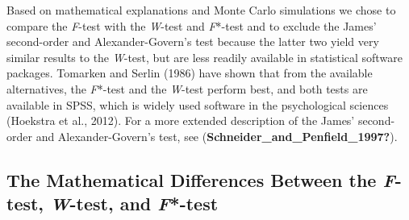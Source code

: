 \documentclass[
  english,
  man]{apa6}
\begin{document}
Based on mathematical explanations and Monte Carlo simulations we chose to compare the \emph{F}-test with the \emph{W}-test and \emph{F}*-test and to exclude the James' second-order and Alexander-Govern's test because the latter two yield very similar results to the \emph{W}-test, but are less readily available in statistical software packages. Tomarken and Serlin (1986) have shown that from the available alternatives, the \emph{F}*-test and the \emph{W}-test perform best, and both tests are available in SPSS, which is widely used software in the psychological sciences (Hoekstra et al., 2012). For a more extended description of the James' second-order and Alexander-Govern's test, see (\textbf{Schneider\_and\_Penfield\_1997?}).

\hypertarget{the-mathematical-differences-between-the-f-test-w-test-and-f-test}{%
\subsection{\texorpdfstring{The Mathematical Differences Between the \emph{F}-test, \emph{W}-test, and \emph{F}*-test}{The Mathematical Differences Between the F-test, W-test, and F*-test}}\label{the-mathematical-differences-between-the-f-test-w-test-and-f-test}}
\end{document}
